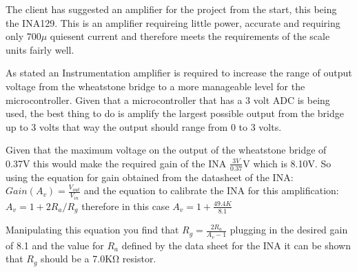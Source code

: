 
The client has suggested an amplifier for the project from the start, this being the INA129. This is an amplifier requireing little power, accurate and requiring only 700\(\mu\) quiesent current and therefore meets the requirements of the scale units fairly well.

As stated an Instrumentation amplifier is required to increase the range of output voltage from the wheatstone bridge to a more manageable level for the microcontroller. Given that a microcontroller that has a 3 volt ADC is being used, the best thing to do is amplify the largest possible output from the bridge up to 3 volts that way the output should range from 0 to 3 volts. 

Given that the maximum voltage on the output of the wheatstone bridge of 0.37V this would make the required gain of the INA \(\frac{3V}{0.37}\)V which is 8.10V. So using the equation for gain obtained from the datasheet of the INA: \(Gain(A_{v}) = \frac{V_{out}}{V_{in}}\) and the equation to calibrate the INA for this amplification: 
$A_v = 1 + 2R_a/R_g$ therefore in this case $A_v = 1 + \frac{49.4K}{8.1}$

Manipulating this equation you find that $R_g = \frac{2R_a}{A_v - 1}$ plugging in the desired gain of 8.1 and the value for $R_a$ defined by the data sheet for the INA it can be shown that $R_g$ should be a 7.0KΩ resistor. 